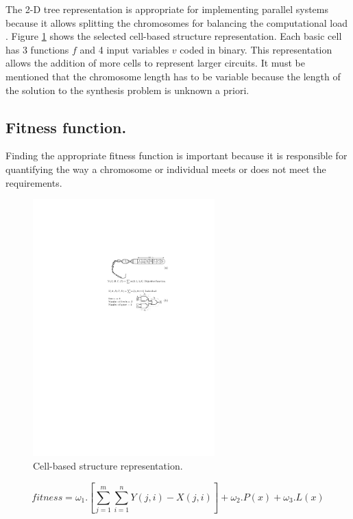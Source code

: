 \documentclass{sig-alternate}
\begin{document}
The 2-D tree representation is appropriate for implementing parallel systems because it allows splitting the chromosomes for balancing the computational load \cite{QYCC06}. Figure \ref{fig:cell_structure} shows the selected cell-based structure representation. Each basic cell has 3 functions $f$ and 4 input variables $v$ coded in binary. This representation allows the addition of more cells to represent larger circuits. It must be mentioned that the chromosome length has to be variable because the length of the solution to the synthesis problem is unknown a priori. 

\subsection{Fitness function.}
Finding the appropriate fitness function is important because it is responsible for quantifying the way a chromosome or individual meets or does not meet the requirements.


\begin{figure}[htpb]
\begin{center} 
\includegraphics[width=7cm]{./images/fitness} \end{center}
\caption{Cell-based structure representation.}\label{fig:cell_structure}
\end{figure}


\begin{equation}
\label{fitness}
fitness=\omega_{1} . [ \sum_{j=1}^m \sum_{i=1}^n Y(j,i)-X(j,i) ] + \omega_{2}.P(x) + \omega_{3}.L(x)
\end{equation}
\end{document}
